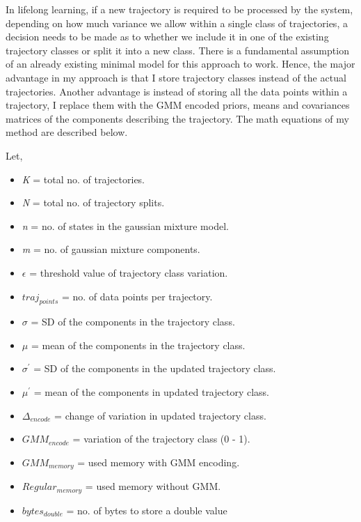 \documentclass[conference]{IEEEtran}
\begin{document}
In lifelong learning, if a new trajectory is required to be processed by the system, depending on how much variance we allow within a single class of trajectories, a decision needs to be made as to whether we include it in one of the existing trajectory classes or split it into a new class. There is a fundamental assumption of an already existing minimal model for this approach to work. Hence, the major advantage in my approach is that I store trajectory classes instead of the actual trajectories. Another advantage is instead of storing all the data points within a trajectory, I replace them with the GMM encoded priors, means and covariances matrices of the components describing the trajectory. The math equations of my method are described below.

Let,

\begin {itemize}
\item[]{\textit{K} = total no. of trajectories.}
\item[]{\textit{N} = total no. of trajectory splits.}
\item[]{\textit{n} = no. of states in the gaussian mixture model.}
\item[]{\textit{m} = no. of gaussian mixture components.}
\item[]{\textit{$\epsilon$} = threshold value of trajectory class variation.}
\item[]{\textit{$traj_{points}$} = no. of data points per trajectory.} 
\item[]{\textit{$\sigma$} = SD of the components in the trajectory class.} 
\item[]{\textit{$\mu$} = mean of the components in the trajectory class.} 
\item[]{\textit{$\sigma^\prime$} = SD of the components in the updated trajectory class.} 
\item[]{\textit{$\mu^\prime$} = mean of the components in updated trajectory class.} 
\item[]{\textit{$\Delta_{encode}$} = change of variation in updated trajectory class.} 
\item[]{\textit{$GMM_{encode}$} = variation of the trajectory class (0 - 1).} 
\item[]{\textit{$GMM_{memory}$} = used memory with GMM encoding.} 
\item[]{\textit{$Regular_{memory}$} = used memory without GMM.} 
\item[]{\textit{$bytes_{double}$} = no. of bytes to store a double value} 
\end {itemize}
\end{document}
